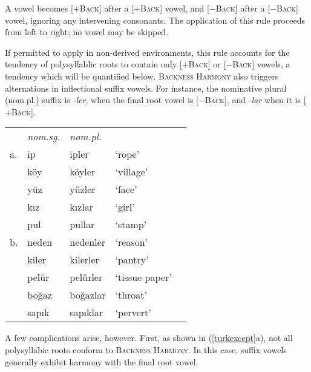 \noindent
A vowel becomes [$+$\textsc{Back}] after a [$+$\textsc{Back}] vowel, and [$-$\textsc{Back}] after a [$-$\textsc{Back}] vowel, ignoring any intervening consonants. The application of this rule proceeds from left to right; no vowel may be skipped. 

If permitted to apply in non-derived environments, this rule accounts for the tendency of polysyllablic roots to contain only [$+$\textsc{Back}] or [$-$\textsc{Back}] vowels, a tendency which will be quantified below. \textsc{Backness Harmony} also triggers alternations in inflectional suffix vowels. For instance, the nominative plural (nom.pl.) suffix is \emph{-ler}, when the final root vowel is [$-$\textsc{Back}], and \emph{-lar} when it is [$+$\textsc{Back}]. 

\begin{example} \label{turknom}
\begin{tabular}{l l l l@{ }l}
   & \emph{nom.sg.} & \emph{nom.pl.} \\
a. & {ip}           & {ipler}    & `rope'         & \citep[][216]{Clements1982} \\
   & {köy}          & {köyler}   & `village'      \\
   & {yüz}          & {yüzler}   & `face'         \\
   & {kız}          & {kızlar}   & `girl'         \\
   & {pul}          & {pullar}   & `stamp'        \\
b. & {neden}        & {nedenler} & `reason'       & \citep{TELL} \\
   & {kiler}        & {kilerler} & `pantry'       \\ %
   & {pelür}        & {pelürler} & `tissue paper' \\ %
   & {boğaz}        & {boğazlar} & `throat'       \\ %
   & {sapık}        & {sapıklar} & `pervert'      \\ %
\end{tabular}
\end{example}

A few complications arise, however. First, as shown in (\ref{turkexcept}a), not all polysyllabic roots conform to \textsc{Backness Harmony}. In this case, suffix vowels generally exhibit harmony with the final root vowel. 

